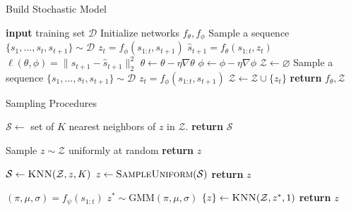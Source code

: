 \documentclass{article}
\begin{document}
\begin{minipage}[t]{7cm}
  \vspace{0pt}

  \begin{algorithm}[H]
    \caption{Build Stochastic Model}
  \begin{algorithmic}[1]
    \State \textbf{input} training set $\mathcal{D}$
    \State Initialize networks $f_\theta, f_\phi$
    \State Sample a sequence $\{s_1, ..., s_t, s_{t+1}\} \sim \mathcal{D}$
    \State $z_t = f_{\phi}(s_{1:t}, s_{t+1})$
    \State $\hat{s}_{t+1} = f_{\theta}(s_{1:t}, z_t)$
    \State $\ell(\theta, \phi) = \|s_{t+1} - \hat{s}_{t+1} \|_2^2$
    \State $\theta \leftarrow \theta - \eta \nabla \theta$
    \State $\phi \leftarrow \phi - \eta \nabla \phi$
    \EndWhile
    \State $\mathcal{Z} \leftarrow \varnothing$
    \State Sample a sequence $\{s_1, ..., s_t, s_{t+1}\} \sim \mathcal{D}$
    \State $z_t = f_{\phi}(s_{1:t}, s_{t+1})$
    \State $\mathcal{Z} \leftarrow \mathcal{Z} \cup \{ z_t \}$
    \EndFor
    \State \textbf{return} $f_\theta, \mathcal{Z}$
  \end{algorithmic}
  \end{algorithm}
\end{minipage}%
\begin{minipage}[t]{7cm}
  \vspace{0pt}

\begin{algorithm}[H]
  \caption{Sampling Procedures}\label{algo-sample}
  \begin{algorithmic}[1]
    \State $\mathcal{S} \gets $ set of $K$ nearest neighbors of $z$ in $\mathcal{Z}$.
    \State \textbf{return} $\mathcal{S}$
    \EndProcedure

    \State Sample $z \sim \mathcal{Z}$ uniformly at random
    \State \textbf{return} $z$
    \EndProcedure

    \State $\mathcal{S} \gets \textsc{KNN}(\mathcal{Z}, z, K)$
    \State $z \gets \textsc{SampleUniform}(\mathcal{S})$
    \State \textbf{return} $z$
    \EndProcedure

    \State $(\pi, \mu, \sigma) = f_\psi(s_{1:t})$
    \State $z^* \sim \mbox{GMM}(\pi, \mu, \sigma)$
    \State $\{z\} \gets \textsc{KNN}(\mathcal{Z}, z^*, 1)$
    \State \textbf{return} $z$
    \EndProcedure
  \end{algorithmic}
\end{algorithm}
\end{minipage}
\end{document}
